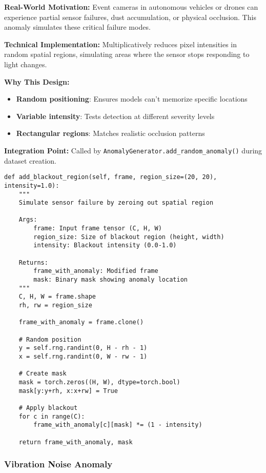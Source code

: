 \documentclass[12pt,a4paper]{article}
\begin{document}
\textbf{Real-World Motivation:} Event cameras in autonomous vehicles or drones can experience partial sensor failures, dust accumulation, or physical occlusion. This anomaly simulates these critical failure modes.

\textbf{Technical Implementation:} Multiplicatively reduces pixel intensities in random spatial regions, simulating areas where the sensor stops responding to light changes.

\textbf{Why This Design:}
\begin{itemize}
    \item \textbf{Random positioning}: Ensures models can't memorize specific locations
    \item \textbf{Variable intensity}: Tests detection at different severity levels
    \item \textbf{Rectangular regions}: Matches realistic occlusion patterns
\end{itemize}

\textbf{Integration Point:} Called by \texttt{AnomalyGenerator.add\_random\_anomaly()} during dataset creation.

\begin{lstlisting}[caption={Blackout Region Implementation - Simulating Sensor Occlusion}]
def add_blackout_region(self, frame, region_size=(20, 20), intensity=1.0):
    """
    Simulate sensor failure by zeroing out spatial region
    
    Args:
        frame: Input frame tensor (C, H, W)
        region_size: Size of blackout region (height, width)
        intensity: Blackout intensity (0.0-1.0)
    
    Returns:
        frame_with_anomaly: Modified frame
        mask: Binary mask showing anomaly location
    """
    C, H, W = frame.shape
    rh, rw = region_size
    
    frame_with_anomaly = frame.clone()
    
    # Random position
    y = self.rng.randint(0, H - rh - 1)
    x = self.rng.randint(0, W - rw - 1)
    
    # Create mask
    mask = torch.zeros((H, W), dtype=torch.bool)
    mask[y:y+rh, x:x+rw] = True
    
    # Apply blackout
    for c in range(C):
        frame_with_anomaly[c][mask] *= (1 - intensity)
    
    return frame_with_anomaly, mask
\end{lstlisting}

\subsubsection{Vibration Noise Anomaly}
\end{document}
